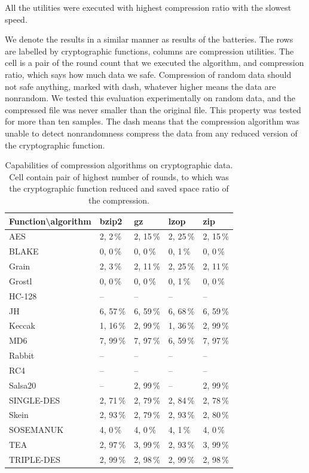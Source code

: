 \documentclass[
  print, %
  Table,   %
  nolof,     %
  nolot,     %
  11pt, %
  oneside  %
]{fithesis3}
\begin{document}
All the utilities were executed with highest compression ratio with the slowest speed.

We denote the results in a similar manner as results of the batteries. The rows are labelled by cryptographic functions, columns are compression utilities. The cell is a pair of the round count that we executed the algorithm, and compression ratio, which says how much data we safe. Compression of random data should not safe anything, marked with dash, whatever higher means the data are nonrandom. We tested this evaluation experimentally on random data, and the compressed file was never smaller than the original file. This property was tested for more than ten samples. The dash means that the compression algorithm was unable to detect nonrandomness compress the data from any reduced version of the cryptographic function.

\begin{table}[H]
\centering{}
\begin{tabular}{l|p{1.8cm} p{1.8cm} p{1.8cm} p{1.8cm}}
Function\textbackslash{}algorithm & 
                bzip2   &   gz      &   lzop    &   zip     \\ \hline
AES         & 2, 2\,\%  & 2, 15\,\% & 2, 25\,\% & 2, 15\,\% \\
BLAKE       & 0, 0\,\%  & 0, 0\,\%  & 0, 1\,\%  & 0, 0\,\%  \\
Grain       & 2, 3\,\%  & 2, 11\,\% & 2, 25\,\% & 2, 11\,\% \\
Grostl      & 0, 0\,\%  & 0, 0\,\%  & 0, 1\,\%  & 0, 0\,\%  \\
HC-128      & --        & --        & --        & --        \\
JH          & 6, 57\,\% & 6, 59\,\% & 6, 68\,\% & 6, 59\,\% \\
Keccak      & 1, 16\,\% & 2, 99\,\% & 1, 36\,\% & 2, 99\,\% \\
MD6         & 7, 99\,\% & 7, 97\,\% & 6, 59\,\% & 7, 97\,\% \\
Rabbit      & --        & --        & --        & --        \\
RC4         & --        & --        & --        & --        \\
Salsa20     & --        & 2, 99\,\% & --        & 2, 99\,\% \\
SINGLE-DES  & 2, 71\,\% & 2, 79\,\% & 2, 84\,\% & 2, 78\,\% \\
Skein       & 2, 93\,\% & 2, 79\,\% & 2, 93\,\% & 2, 80\,\% \\
SOSEMANUK   & 4, 0\,\%  & 4, 0\,\%  & 4, 1\,\%  & 4, 0\,\%  \\
TEA         & 2, 97\,\% & 3, 99\,\% & 2, 93\,\% & 3, 99\,\% \\
TRIPLE-DES  & 2, 99\,\% & 2, 98\,\% & 2, 99\,\% & 2, 98\,\% 

\end{tabular}
\caption{Capabilities of compression algorithms on cryptographic data. Cell contain pair of highest number of rounds, to which was the cryptographic function reduced and saved space ratio of the compression.}
\label{table:res-compression}
\end{table}
\end{document}

